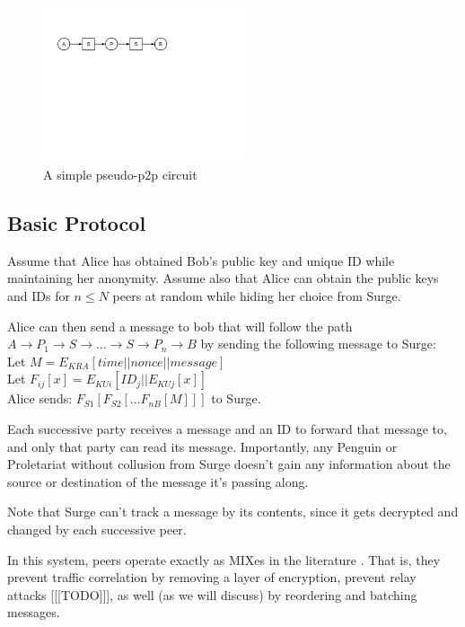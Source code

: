 \documentclass{paper}
\begin{document}
\begin{figure}[ht]
  \includegraphics[width=230px]{PSP.png}
  \caption{A simple pseudo-p2p circuit}
\end{figure}

\subsection{Basic Protocol}
Assume that Alice has obtained Bob's public key and unique ID while maintaining her anonymity. Assume also that Alice can obtain the public keys and IDs for $n \le N$ peers at random while hiding her choice from Surge. 

Alice can then send a message to bob that will follow the path $A \rightarrow P_1 \rightarrow S \rightarrow ... \rightarrow S \rightarrow P_n \rightarrow B$ by sending the following message to Surge: 
\\
Let $M = E_{KRA}[  time || nonce || message ]$
\\Let $F_{ij}[x] = E_{KUi}[ ID_j || E_{KUj}[ x ] ]$
\\
Alice sends: $F_{S1}[F_{S2}[...F_{nB}[ M ]]]$ to Surge. 

Each successive party receives a message and an ID to forward that message to, and only that party can read its message. Importantly, any Penguin or Proletariat without collusion from Surge doesn't gain any information about the source or destination of the message it's passing along. 

Note that Surge can't track a message by its contents, since it gets decrypted and changed by each successive peer. 

In this system, peers operate exactly as MIXes in the literature \cite{chaum-mix} . That is, they prevent traffic correlation by removing a layer of encryption, prevent relay attacks [[[TODO]]], as well (as we will discuss) by reordering and batching messages. 
\end{document}
